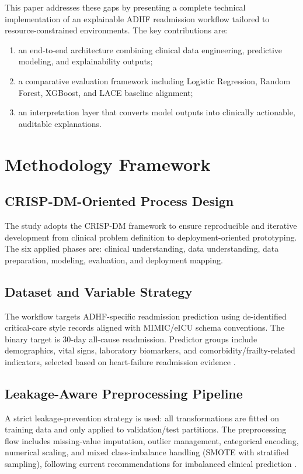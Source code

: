 \documentclass[conference]{IEEEtran}
\begin{document}
This paper addresses these gaps by presenting a complete technical implementation of an explainable ADHF readmission workflow tailored to resource-constrained environments. The key contributions are:
\begin{enumerate}
    \item an end-to-end architecture combining clinical data engineering, predictive modeling, and explainability outputs;
    \item a comparative evaluation framework including Logistic Regression, Random Forest, XGBoost, and LACE baseline alignment;
    \item an interpretation layer that converts model outputs into clinically actionable, auditable explanations.
\end{enumerate}

\section{Methodology Framework}
\subsection{CRISP-DM-Oriented Process Design}
The study adopts the CRISP-DM framework to ensure reproducible and iterative development from clinical problem definition to deployment-oriented prototyping. The six applied phases are: clinical understanding, data understanding, data preparation, modeling, evaluation, and deployment mapping.

\subsection{Dataset and Variable Strategy}
The workflow targets ADHF-specific readmission prediction using de-identified critical-care style records aligned with MIMIC/eICU schema conventions. The binary target is 30-day all-cause readmission. Predictor groups include demographics, vital signs, laboratory biomarkers, and comorbidity/frailty-related indicators, selected based on heart-failure readmission evidence \cite{ref05_zhang_2024,ref15_sabouri_2023,ref24_mohanty_2022}.

\subsection{Leakage-Aware Preprocessing Pipeline}
A strict leakage-prevention strategy is used: all transformations are fitted on training data and only applied to validation/test partitions. The preprocessing flow includes missing-value imputation, outlier management, categorical encoding, numerical scaling, and mixed class-imbalance handling (SMOTE with stratified sampling), following current recommendations for imbalanced clinical prediction \cite{ref20_zhao_2020}.
\end{document}
